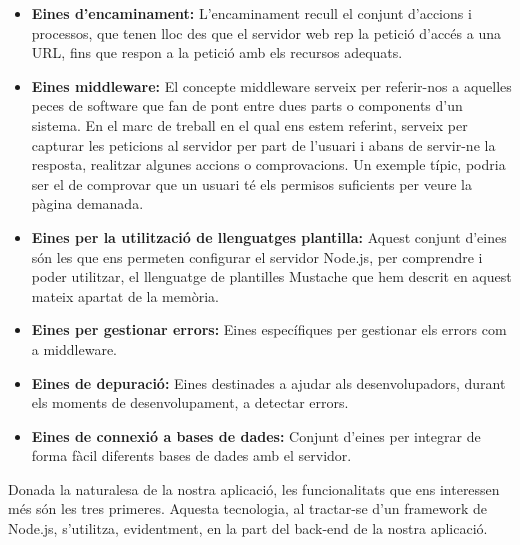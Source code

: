     \begin{itemize}
        \item \textbf{Eines d'encaminament:} L'encaminament recull el conjunt d'accions i processos, que tenen lloc des que el servidor web rep la petició d'accés a una URL, fins que respon a la petició amb els recursos adequats.
        \item \textbf{Eines middleware:} El concepte middleware serveix per referir-nos a aquelles peces de software que fan de pont entre dues parts o components d'un sistema. En el marc de treball en el qual ens estem referint, serveix per capturar les peticions al servidor per part de l'usuari i abans de servir-ne la resposta, realitzar algunes accions o comprovacions. Un exemple típic, podria ser el de comprovar que un usuari té els permisos suficients per veure la pàgina demanada.
        \item \textbf{Eines per la utilització de llenguatges plantilla:} Aquest conjunt d'eines són les que ens permeten configurar el servidor Node.js, per comprendre i poder utilitzar, el llenguatge de plantilles Mustache que hem descrit en aquest mateix apartat de la memòria.
        \item \textbf{Eines per gestionar errors:} Eines específiques per gestionar els errors com a middleware.
        \item \textbf{Eines de depuració:} Eines destinades a ajudar als desenvolupadors, durant els moments de desenvolupament, a detectar errors.
        \item \textbf{Eines de connexió a bases de dades:} Conjunt d'eines per integrar de forma fàcil diferents bases de dades amb el servidor.
    \end{itemize}

    Donada la naturalesa de la nostra aplicació, les funcionalitats que ens in\-te\-ressen més són les tres primeres. Aquesta tecnologia, al tractar-se d'un framework de Node.js, s'utilitza, evidentment, en la part del back-end de la nostra aplicació.

